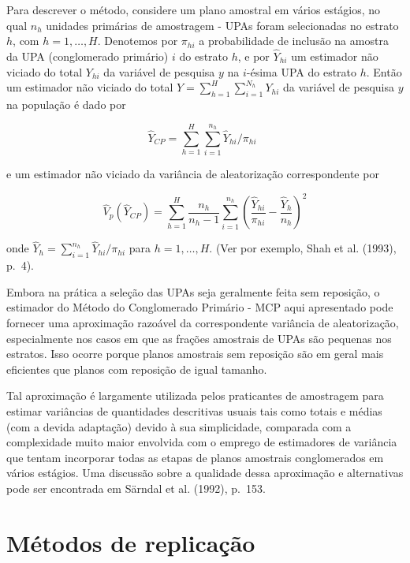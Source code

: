 \documentclass[
  12pt,
  brazilian,
]{book}
\theoremstyle{definition}
\theoremstyle{definition}
\theoremstyle{definition}
\theoremstyle{definition}
\theoremstyle{remark}
\begin{document}
Para descrever o método, considere um plano amostral em vários estágios, no qual \(n_{h}\) unidades primárias de amostragem - UPAs foram selecionadas no estrato \(h\), com \(h=1, \ldots, H\). Denotemos por \(\pi_{hi}\) a probabilidade de inclusão na amostra da UPA (conglomerado primário) \(i\) do estrato \(h\), e por \(\widehat{Y}_{hi}\) um estimador não viciado do total \(Y_{hi}\) da variável de pesquisa \(y\) na \(i\)-ésima UPA do estrato \(h\). Então um estimador não viciado do total \(Y = \sum_{h=1}^{H} \sum_{i=1}^{N_{h}} Y_{hi}\) da variável de pesquisa \(y\) na população é dado por

\begin{equation}
\widehat{Y}_{CP} = \sum_{h=1}^{H} \sum_{i=1}^{n_{h}} \widehat{Y}_{hi} / \pi _{hi} \,\,\, \label{eq:estpa23} 
\end{equation}

e um estimador não viciado da variância de aleatorização correspondente por

\begin{equation}
\widehat{V}_{p} \left( \widehat{Y}_{CP}\right) = \sum_{h=1}^{H}\frac{n_{h}}
{n_{h}-1} \sum_{i=1}^{n_{h}} \left( \frac{\widehat{Y}_{hi}}{\pi _{hi}} -
\frac{\widehat{Y}_{h}}{n_{h}} \right) ^{2}  \label{eq:estpa24}
\end{equation}

onde \(\widehat{Y}_{h} = \sum_{i=1}^{n_{h}} \widehat{Y}_{hi} / \pi _{hi}\) para
\(h=1,\ldots ,H\). (Ver por exemplo, Shah et al. (1993), p.~4).

Embora na prática a seleção das UPAs seja geralmente feita sem reposição, o estimador do Método do Conglomerado Primário - MCP aqui apresentado pode fornecer uma aproximação razoável da correspondente variância de aleatorização, especialmente nos casos em que as frações amostrais de UPAs são pequenas nos estratos. Isso ocorre porque planos amostrais sem reposição são em geral mais eficientes que planos com reposição de igual tamanho.

Tal aproximação é largamente utilizada pelos praticantes de amostragem para estimar variâncias de quantidades descritivas usuais tais como totais e médias (com a devida adaptação) devido à sua simplicidade, comparada com a complexidade muito maior envolvida com o emprego de estimadores de variância que tentam incorporar todas as etapas de planos amostrais conglomerados em vários estágios. Uma discussão sobre a qualidade dessa aproximação e alternativas pode ser encontrada em Särndal et al. (1992), p.~153.

\hypertarget{muxe9todos-de-replicauxe7uxe3o}{%
\section{Métodos de replicação}\label{muxe9todos-de-replicauxe7uxe3o}}
\end{document}
